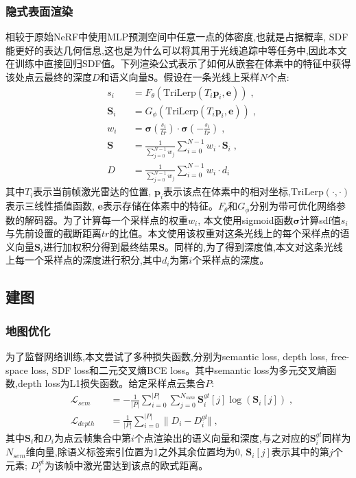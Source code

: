 \subsubsection{隐式表面渲染}
相较于原始NeRF中使用MLP预测空间中任意一点的体密度,也就是占据概率, SDF能更好的表达几何信息,这也是为什么可以将其用于光线追踪中等任务中,因此本文在训练中直接回归SDF值。下列渲染公式表示了如何从嵌套在体素中的特征中获得该处点云最终的深度$D$和语义向量$\mathbf{S}$。假设在一条光线上采样$N$个点:
\begin{equation}
\begin{alignedat}{2}
    &s_i&&=F_\theta(\mbox{TriLerp}(T_i\mathbf{p}_i,\mathbf{e}))\;,\\
    &\mathbf{S}_i&&=G_\phi(\mbox{TriLerp}(T_i\mathbf{p}_i,\mathbf{e}))\;,\\
    &w_i&&=\mathbf{\sigma}(\frac{s_i}{tr})\cdot\mathbf{\sigma}(-\frac{s_i}{tr})\;,\\
    &\mathbf{S} &&= \frac{1}{\sum_{j=0}^{N-1}w_j}\sum_{i=0}^{N-1}w_i\cdot\mathbf{S}_i\;,\\
    &D &&= \frac{1}{\sum_{j=0}^{N-1}w_j}\sum_{i=0}^{N-1}w_i\cdot d_i
\end{alignedat}
\end{equation}
其中$T_i$表示当前帧激光雷达的位置, $\mathbf{p}_i$表示该点在体素中的相对坐标,$\mbox{TriLerp}(\cdot , \cdot)$表示三线性插值函数, $\mathbf{e}$表示存储在体素中的特征。$F_\theta\mbox{和}G_\phi$分别为带可优化网络参数的解码器。为了计算每一个采样点的权重$w_i$, 本文使用sigmoid函数$\mathbf{\sigma}$计算sdf值$s_i$与先前设置的截断距离$tr$的比值。本文使用该权重对这条光线上的每个采样点的语义向量$\mathbf{S}_i$进行加权积分得到最终结果$\mathbf{S}$。同样的,为了得到深度值,本文对这条光线上每一个采样点的深度进行积分,其中$d_i$为第$i$个采样点的深度。
\subsection{建图}
\subsubsection{地图优化}
为了监督网络训练,本文尝试了多种损失函数,分别为semantic loss, depth loss, free-space loss, SDF loss和二元交叉熵BCE loss。其中semantic loss为多元交叉熵函数,depth loss为L1损失函数。给定采样点云集合$P$:
\begin{equation}
\begin{alignedat}{2}
    &\mathcal{L}_{sem} &&= -\frac{1}{|P|}\sum_{i=0}^{|P|}\sum_{j=0}^{N_{sum}}\mathbf{S}_i^{gt}[j]\log(\mathbf{S}_i[j])\;,\\
    &\mathcal{L}_{depth} &&= \frac{1}{|P|}\sum_{i=0}^{|P|}\| D_i-D_i^{gt}\Vert\;,
\end{alignedat}
\end{equation}
其中$\mathbf{S}_i$和$D_i$为点云帧集合中第$i$个点渲染出的语义向量和深度,与之对应的$\mathbf{S}_i^{gt}$同样为$N_{sem}$维向量,除语义标签索引位置为1之外其余位置均为0, $\mathbf{S}_i[j]$表示其中的第$j$个元素; $D_i^{gt}$为该帧中激光雷达到该点的欧式距离。 

